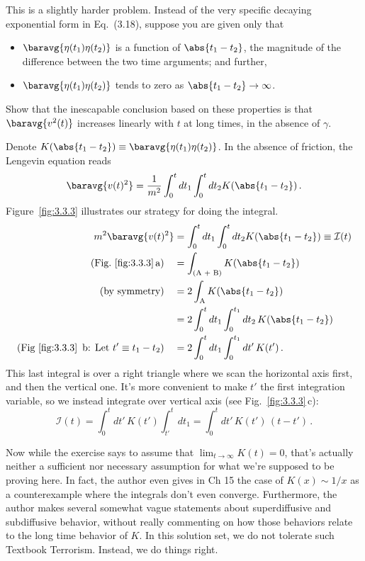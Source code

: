 

This is a slightly harder problem.
Instead of the very specific decaying exponential form in Eq.~(3.18), suppose you are given only that
\begin{itemize}
  \item $\baravg{\eta(t_1)\eta(t_2)}$ is a function of $\abs{t_1-t_2}$, the magnitude of the difference between the two time arguments; and further,
  \item $\baravg{\eta(t_1)\eta(t_2)}$ tends to zero as $\abs{t_1 - t_2} \rightarrow \infty$.
\end{itemize}
Show that the inescapable conclusion based on these properties is that $\baravg{v^2(t)}$ increases linearly with $t$ at long times, in the absence of $\gamma$.


Denote $K(\abs{t_1 - t_2}) \equiv \baravg{\eta(t_1)\eta(t_2)}$.
In the absence of friction, the Lengevin equation reads
\begin{equation*}
  \baravg{v(t)^2} = \frac{1}{m^2} \int_0^t dt_1 \int_0^t dt_2 K(\abs{t_1 - t_2}) \, .
\end{equation*}
Figure~\ref{fig:3.3.3} illustrates our strategy for doing the integral.
\begin{align*}
  m^2 \baravg{v(t)^2}
  &= \int_0^t dt_1 \int_0^t dt_2 K(\abs{t_1 - t_2}) \equiv \mathcal{I}(t) \\
  (\text{Fig.~\ref{fig:3.3.3}\,a}) \quad &= \int_\text{(A + B)} K(\abs{t_1 - t_2}) \\
  \text{(by symmetry)} \quad &= 2 \int_\text{A} K(\abs{t_1 - t_2}) \\
  &= 2 \int_0^t dt_1 \int_0^{t_1} dt_2 \, K(\abs{t_1 - t_2}) \\
  (\text{Fig~\ref{fig:3.3.3}\, b: Let }t' \equiv t_1 - t_2) \quad &= 2 \int_0^t dt_1 \int_0^{t_1} dt' \, K(t')
  \, .
\end{align*}
This last integral is over a right triangle where we scan the horizontal axis first, and then the vertical one.
It's more convenient to make $t'$ the first integration variable, so we instead integrate over vertical axis (see Fig.~\ref{fig:3.3.3}\,c):
\begin{equation*}
  \mathcal{I}(t) = \int_0^t dt' \, K(t') \int_{t'}^t dt_1 = \int_0^t dt' \, K(t') \, (t - t')
  \, .
\end{equation*}

Now while the exercise says to assume that $\lim_{t \rightarrow \infty} K(t) = 0$, that's actually neither a sufficient nor necessary assumption for what we're supposed to be proving here.
In fact, the author even gives in Ch 15 the case of $K(x) \sim 1/x$ as a counterexample where the integrals don't even converge.
Furthermore, the author makes several somewhat vague statements about superdiffusive and subdiffusive behavior, without really commenting on how those behaviors relate to the long time behavior of $K$.
In this solution set, we do not tolerate such Textbook Terrorism.
Instead, we do things right.

